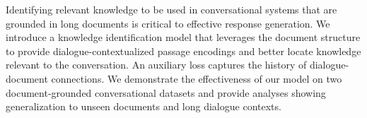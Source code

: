 Identifying relevant knowledge to be used in conversational systems that are grounded in long documents is critical to effective response generation. We introduce a knowledge identification model that leverages the document structure to provide dialogue-contextualized passage encodings and better locate knowledge relevant to the conversation. An auxiliary loss captures the history of dialogue-document connections. We demonstrate the effectiveness of our model on two document-grounded conversational datasets and provide analyses showing generalization to unseen documents and long dialogue contexts.
